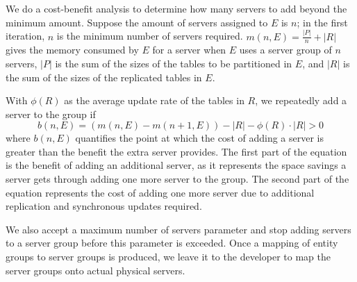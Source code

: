 We do a cost-benefit analysis to determine how many servers to add beyond the minimum amount. Suppose the amount of servers assigned to $E$ is $n$; in the first iteration, $n$ is the minimum number of servers required. $m(n, E) = \frac{|P|}{n} + |R|$ gives the memory consumed by $E$ for a server when $E$ uses a server group of $n$ servers, $|P|$ is the sum of the sizes of the tables to be partitioned in $E$, and $|R|$ is the sum of the sizes of the replicated tables in $E$.  

With $\phi(R)$ as the average update rate of the tables in $R$, we repeatedly add a server to the group if 
\vspace*{-4pt}
{\small
\begin{equation}
b(n,E) = (m(n,E) - m(n+1,E)) - |R| - \phi(R) \cdot |R| > 0
\end{equation}
}
where $b(n,E)$ quantifies the point at which the cost of adding a server is greater than the benefit the extra server provides. The first part of the equation is the benefit of adding an additional server, as it represents the space savings a server gets through adding one more server to the group. The second part of the equation represents the cost of adding one more server due to additional replication and synchronous updates required.

We also accept a maximum number of servers parameter and stop adding servers to a server group before this parameter is exceeded.  Once a mapping of entity groups to server groups is produced, we leave it to the developer to map the server groups onto actual physical servers.


